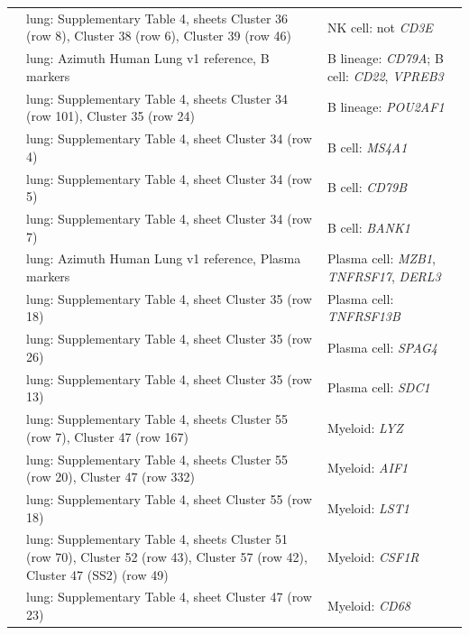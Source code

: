 \begin{longtable}{@{}>{\raggedright\arraybackslash}p{2.0cm} >{\raggedright\arraybackslash}p{4.6cm} >{\raggedright\arraybackslash}p{8.4cm}@{}}
\cite{travagliniMolecularCellAtlas2020} & lung: Supplementary Table 4, sheets Cluster 36 (row 8), Cluster 38 (row 6), Cluster 39 (row 46) & NK cell: not \textit{CD3E} \\
\cite{travagliniMolecularCellAtlas2020} & lung: Azimuth Human Lung v1 reference, B markers & B lineage: \textit{CD79A}; B cell: \textit{CD22}, \textit{VPREB3} \\
\cite{travagliniMolecularCellAtlas2020} & lung: Supplementary Table 4, sheets Cluster 34 (row 101), Cluster 35 (row 24) & B lineage: \textit{POU2AF1} \\
\cite{travagliniMolecularCellAtlas2020} & lung: Supplementary Table 4, sheet Cluster 34 (row 4) & B cell: \textit{MS4A1} \\
\cite{travagliniMolecularCellAtlas2020} & lung: Supplementary Table 4, sheet Cluster 34 (row 5) & B cell: \textit{CD79B} \\
\cite{travagliniMolecularCellAtlas2020} & lung: Supplementary Table 4, sheet Cluster 34 (row 7) & B cell: \textit{BANK1} \\
\cite{travagliniMolecularCellAtlas2020} & lung: Azimuth Human Lung v1 reference, Plasma markers & Plasma cell: \textit{MZB1}, \textit{TNFRSF17}, \textit{DERL3} \\
\cite{travagliniMolecularCellAtlas2020} & lung: Supplementary Table 4, sheet Cluster 35 (row 18) & Plasma cell: \textit{TNFRSF13B} \\
\cite{travagliniMolecularCellAtlas2020} & lung: Supplementary Table 4, sheet Cluster 35 (row 26) & Plasma cell: \textit{SPAG4} \\
\cite{travagliniMolecularCellAtlas2020} & lung: Supplementary Table 4, sheet Cluster 35 (row 13) & Plasma cell: \textit{SDC1} \\
\cite{travagliniMolecularCellAtlas2020} & lung: Supplementary Table 4, sheets Cluster 55 (row 7), Cluster 47 (row 167) & Myeloid: \textit{LYZ} \\
\cite{travagliniMolecularCellAtlas2020} & lung: Supplementary Table 4, sheets Cluster 55 (row 20), Cluster 47 (row 332) & Myeloid: \textit{AIF1} \\
\cite{travagliniMolecularCellAtlas2020} & lung: Supplementary Table 4, sheet Cluster 55 (row 18) & Myeloid: \textit{LST1} \\
\cite{travagliniMolecularCellAtlas2020} & lung: Supplementary Table 4, sheets Cluster 51 (row 70), Cluster 52 (row 43), Cluster 57 (row 42), Cluster 47 (SS2) (row 49) & Myeloid: \textit{CSF1R} \\
\cite{travagliniMolecularCellAtlas2020} & lung: Supplementary Table 4, sheet Cluster 47 (row 23) & Myeloid: \textit{CD68} \\

\end{longtable}
